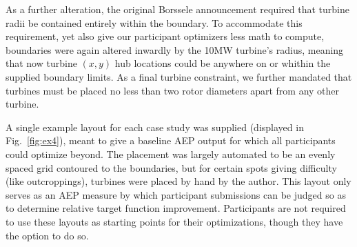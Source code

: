 	As a further alteration, the original Borssele announcement required that turbine radii be contained entirely within the boundary.
	To accommodate this requirement, yet also give our participant optimizers less math to compute, boundaries were again altered inwardly by the 10MW turbine's radius, meaning that now turbine $(x, y)$ hub locations could be anywhere on or whithin the supplied boundary limits.
	As a final turbine constraint, we further mandated that turbines must be placed no less than two rotor diameters apart from any other turbine.

	A single example layout for each case study was supplied (displayed in Fig.~\ref{fig:ex4}), meant to give a baseline AEP output for which all participants could optimize beyond.
	The placement was largely automated to be an evenly spaced grid contoured to the boundaries, but for certain spots giving difficulty (like outcroppings), turbines were placed by hand by the author.
	This layout only serves as an AEP measure by which participant submissions can be judged so as to determine relative target function improvement.
	Participants are not required to use these layouts as starting points for their optimizations, though they have the option to do so.

